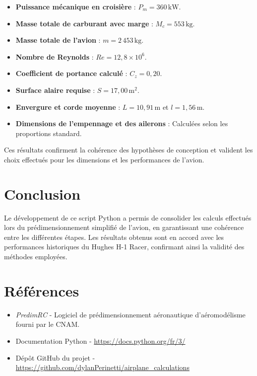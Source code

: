 \documentclass[12pt,a4paper]{article}
\begin{document}
\begin{itemize}
    \item \textbf{Puissance mécanique en croisière} : $P_m = 360 \, \text{kW}$.
    \item \textbf{Masse totale de carburant avec marge} : $M_c = 553 \, \text{kg}$.
    \item \textbf{Masse totale de l'avion} : $m = 2\,453 \, \text{kg}$.
    \item \textbf{Nombre de Reynolds} : $Re = 12{,}8 \times 10^6$.
    \item \textbf{Coefficient de portance calculé} : $C_z = 0{,}20$.
    \item \textbf{Surface alaire requise} : $S = 17{,}00 \, \text{m}^2$.
    \item \textbf{Envergure et corde moyenne} : $L = 10{,}91 \, \text{m}$ et $l = 1{,}56 \, \text{m}$.
    \item \textbf{Dimensions de l'empennage et des ailerons} : Calculées selon les proportions standard.
\end{itemize}

Ces résultats confirment la cohérence des hypothèses de conception et valident les choix effectués pour les dimensions et les performances de l'avion.

\section{Conclusion}

Le développement de ce script Python a permis de consolider les calculs effectués lors du prédimensionnement simplifié de l'avion, en garantissant une cohérence entre les différentes étapes. Les résultats obtenus sont en accord avec les performances historiques du Hughes H-1 Racer, confirmant ainsi la validité des méthodes employées.

\section*{Références}

\begin{itemize}
    \item \textit{PredimRC} - Logiciel de prédimensionnement aéronautique d'aéromodélisme fourni par le CNAM.
    \item Documentation Python - \url{https://docs.python.org/fr/3/}
    \item Dépôt GitHub du projet - \url{https://github.com/dylanPerinetti/airplane_calculations}
\end{itemize}
\end{document}
